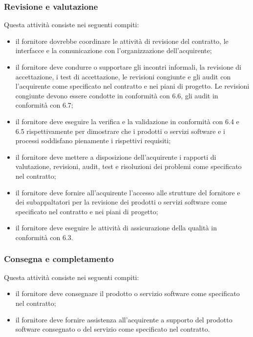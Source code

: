         \subsubsection{Revisione e valutazione}\label{sec:revisione e valutazione}
            Questa attività consiste nei seguenti compiti:
            \begin{itemize}
                \item il fornitore dovrebbe coordinare le attività di revisione del contratto, le interfacce e la comunicazione con l'organizzazione dell'acquirente;
                \item il fornitore deve condurre o supportare gli incontri informali, la revisione di accettazione, i test di accettazione, le revisioni congiunte e gli audit con l'acquirente come specificato nel contratto e nei piani di progetto. Le revisioni congiunte devono essere condotte in conformità con 6.6, gli audit in conformità con 6.7;
                \item il fornitore deve eseguire la verifica e la validazione in conformità con 6.4 e 6.5 rispettivamente per dimostrare che i prodotti o servizi software e i processi soddisfano pienamente i rispettivi requisiti;
                \item il fornitore deve mettere a disposizione dell'acquirente i rapporti di valutazione, revisioni, audit, test e risoluzioni dei problemi come specificato nel contratto;
                \item il fornitore deve fornire all'acquirente l'accesso alle strutture del fornitore e dei subappaltatori per la revisione dei prodotti o servizi software come specificato nel contratto e nei piani di progetto;
                \item il fornitore deve eseguire le attività di assicurazione della qualità in conformità con 6.3.
            \end{itemize}
        
        \subsubsection{Consegna e completamento}\label{sec:consegna e completamento}
            Questa attività consiste nei seguenti compiti:
            \begin{itemize}
                \item il fornitore deve consegnare il prodotto o servizio software come specificato nel contratto;
                \item il fornitore deve fornire assistenza all'acquirente a supporto del prodotto software consegnato o del servizio come specificato nel contratto.
            \end{itemize}



    
        
        